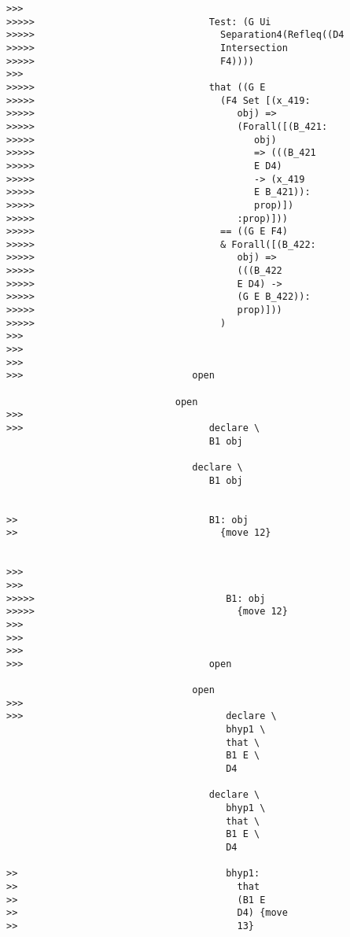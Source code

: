 \documentclass[12pt]{article}
\begin{document}
\begin{verbatim}
>>>
>>>>>                               Test: (G Ui
>>>>>                                 Separation4(Refleq((D4
>>>>>                                 Intersection
>>>>>                                 F4))))
>>>
>>>>>                               that ((G E
>>>>>                                 (F4 Set [(x_419:
>>>>>                                    obj) =>
>>>>>                                    (Forall([(B_421:
>>>>>                                       obj)
>>>>>                                       => (((B_421
>>>>>                                       E D4)
>>>>>                                       -> (x_419
>>>>>                                       E B_421)):
>>>>>                                       prop)])
>>>>>                                    :prop)]))
>>>>>                                 == ((G E F4)
>>>>>                                 & Forall([(B_422:
>>>>>                                    obj) =>
>>>>>                                    (((B_422
>>>>>                                    E D4) ->
>>>>>                                    (G E B_422)):
>>>>>                                    prop)]))
>>>>>                                 )
>>>
>>>
>>>
>>>                              open

                              open
>>>
>>>                                 declare \
                                    B1 obj

                                 declare \
                                    B1 obj


>>                                  B1: obj
>>                                    {move 12}


>>>
>>>
>>>>>                                  B1: obj
>>>>>                                    {move 12}
>>>
>>>
>>>
>>>                                 open

                                 open
>>>
>>>                                    declare \
                                       bhyp1 \
                                       that \
                                       B1 E \
                                       D4

                                    declare \
                                       bhyp1 \
                                       that \
                                       B1 E \
                                       D4

>>                                     bhyp1:
>>                                       that
>>                                       (B1 E
>>                                       D4) {move
>>                                       13}



\end{verbatim}
\end{document}
